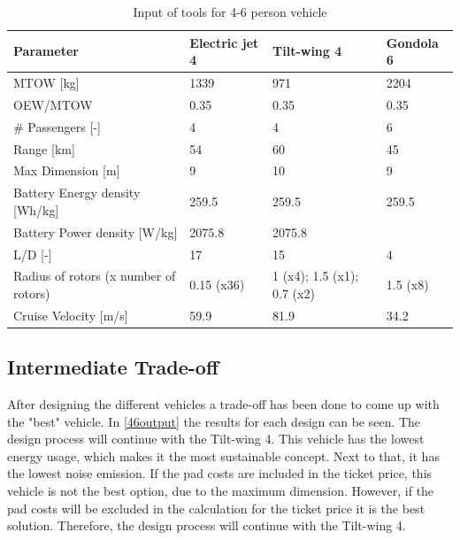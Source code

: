 \begin{table}[H]
\captionsetup{justification=centering}
\caption{Input of tools for 4-6 person vehicle}
\label{46input}
\begin{tabular}{@{}llll@{}}
\toprule
\textbf{Parameter}                       & \textbf{Electric jet 4} & \textbf{Tilt-wing 4} & \textbf{Gondola 6} \\ \midrule
MTOW {[}kg{]}                            & 1339                   & 971                   & 2204                    \\
OEW/MTOW           & 0.35                   & 0.35                   & 0.35                    \\
\# Passengers {[}-{]}                    & 4                   &  4                  & 6                   \\
Range {[}km{]}                           & 54                   &  60                  & 45                    \\
Max Dimension {[}m{]}                    & 9                   & 10                    & 9                   \\
Battery Energy density {[}Wh/kg{]}       & 259.5                   & 259.5                    & 259.5                      \\
Battery Power density {[}W/kg{]}         & 2075.8                   & 2075.8                   &                     \\
L/D {[}-{]}                              & 17                   & 15                   & 4                    \\
Radius of rotors (x number of rotors)      & 0.15 (x36)           & 1 (x4); 1.5 (x1); 0.7 (x2) & 1.5 (x8)                    \\
Cruise Velocity {[}m/s{]}                & 59.9                   & 81.9                    & 34.2                    \\ \bottomrule
\end{tabular}

\end{table}


\subsection{Intermediate Trade-off}
After designing the different vehicles a trade-off has been done to come up with the "best" vehicle. In \autoref{46output} the results for each design can be seen. The design process will continue with the Tilt-wing 4. This vehicle has the lowest energy usage, which makes it the most sustainable concept. Next to that, it has the lowest noise emission. If the pad costs are included in the ticket price, this vehicle is not the best option, due to the maximum dimension. However, if the pad costs will be excluded in the calculation for the ticket price it is the best solution. Therefore, the design process will continue with the Tilt-wing 4.


